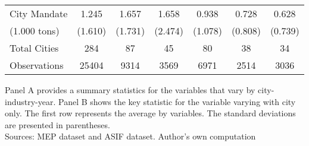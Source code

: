\documentclass[
  convert={
    density=800 -alpha deactivate,
    size=1080x800,
    outext=.png
  },
]{standalone}
\begin{document}
\begin{table}[htbp]
{\begin{threeparttable}
\begin{tabular}{l*{6}{c}}
    City Mandate &	1.245&	1.657&	1.658&	0.938&	0.728	&0.628\\
    (1.000 tons)&	(1.610)&	(1.731)&	(2.474)	&(1.078)	&(0.808)	&(0.739)\\
    \bottomrule
    
    Total Cities&	284&	87&	45&	80	&38	&34\\
    Observations &	25404&	9314&	3569&	6971&	2514&	3036\\
    \hline
  \end{tabular}
  \begin{tablenotes}
      \small
      \item Panel A provides a summary statistics for the variables that vary by city-industry-year. Panel B shows the key statistic for the variable varying with city only. The first row represents the average by variables. The standard deviations are presented in parentheses. \\
      Sources: MEP dataset and ASIF dataset. Author's own computation 
    \end{tablenotes}
\label{tab:table1}
\end{threeparttable}}
\end{table} 
\end{document}
